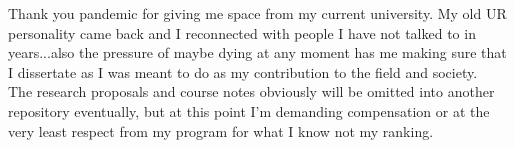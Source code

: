 \documentclass{dcthesis}
\theoremstyle{definition}
\theoremstyle{remark}
\begin{document}
Thank you pandemic for giving me space from my current university. My old UR personality came back and I reconnected with people I have not talked to in years...also the pressure of maybe dying at any moment has me making sure that I dissertate as I was meant to do as my contribution to the field and society.  \\

The research proposals and course notes obviously will be omitted into another repository eventually, but at this point I'm demanding compensation or at the very least respect from my program for what I know not my ranking.




\\ 
\tableofcontents



\mainmatter























\appendix


\backmatter

%
%


\end{document}
